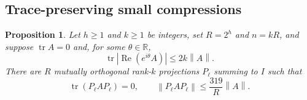 \documentclass[11pt]{article}
\newtheorem{proposition}[theorem]{Proposition}
\theoremstyle{remark}
\newcommand{\R}{\mathbb R}
\newcommand{\tr}{\operatorname{tr}}
\newcommand{\Rea}{\operatorname{Re}}
\newcommand{\norm}[1]{\left\lVert#1\right\rVert}
\numberwithin{equation}{section}
\begin{document}
\subsection{Trace-preserving small compressions}
\begin{proposition}\label{prop:low}
Let $h\ge1$ and $k\ge1$ be integers, set $R=2^h$ and $n=kR$, and suppose
$\tr A=0$ and, for some
$\theta\in\R$,
\begin{equation}\label{eq:lowmass}
 \tr|\Rea(e^{i\theta}A)|\le2k\norm A.
\end{equation}
There are $R$ mutually orthogonal rank-$k$ projections $P_\ell$ summing to $I$
such that
\begin{equation}\label{eq:lowconclusion}
 \tr(P_\ell AP_\ell)=0,\qquad
 \norm{P_\ell AP_\ell}\le\frac{319}{R}\norm A.
\end{equation}
\end{proposition}
\end{document}
